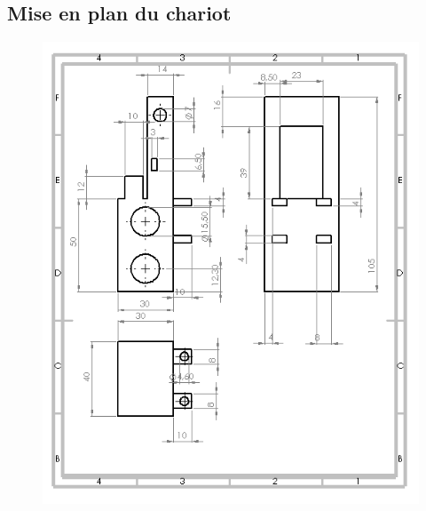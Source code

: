 \begin{changemargin}{-2cm}{-4cm}
\chapter*{Mise en plan du chariot}
\begin{figure}[!h]
 \center
 \includegraphics[scale=1]{../3Dmodels/chariot.png}
\end{figure}


\end{changemargin}
